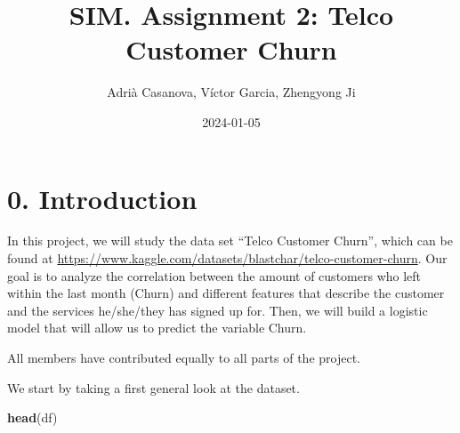 \documentclass[
]{article}
\title{SIM. Assignment 2: Telco Customer Churn}
\author{Adrià Casanova, Víctor Garcia, Zhengyong Ji}
\date{2024-01-05}
\newenvironment{Shaded}{\begin{snugshade}}{\end{snugshade}}
\newcommand{\FunctionTok}[1]{\textcolor[rgb]{0.13,0.29,0.53}{\textbf{#1}}}
\newcommand{\NormalTok}[1]{#1}
\begin{document}
\maketitle

{
\setcounter{tocdepth}{3}
\tableofcontents
}
\hypertarget{introduction}{%
\section{0. Introduction}\label{introduction}}

In this project, we will study the data set ``Telco Customer Churn'',
which can be found at
\url{https://www.kaggle.com/datasets/blastchar/telco-customer-churn}.
Our goal is to analyze the correlation between the amount of customers
who left within the last month (Churn) and different features that
describe the customer and the services he/she/they has signed up for.
Then, we will build a logistic model that will allow us to predict the
variable Churn.

All members have contributed equally to all parts of the project.

We start by taking a first general look at the dataset.

\begin{Shaded}
\begin{Highlighting}[]
\FunctionTok{head}\NormalTok{(df)}
\end{Highlighting}
\end{Shaded}
\end{document}
